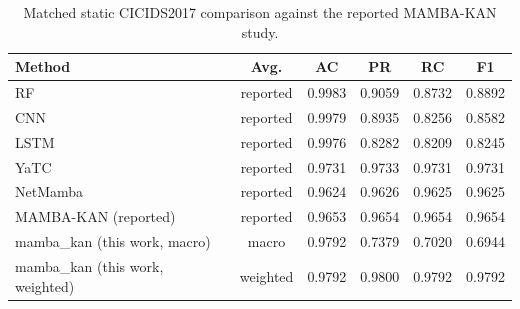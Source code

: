\begin{table}[t]
\centering
\caption{Matched static CICIDS2017 comparison against the reported MAMBA-KAN study.}
\label{tab:cicids2017-static-reference}
\begin{tabular}{lccccc}
\hline
Method & Avg. & AC & PR & RC & F1 \\
\hline
RF & reported & 0.9983 & 0.9059 & 0.8732 & 0.8892 \\
CNN & reported & 0.9979 & 0.8935 & 0.8256 & 0.8582 \\
LSTM & reported & 0.9976 & 0.8282 & 0.8209 & 0.8245 \\
YaTC & reported & 0.9731 & 0.9733 & 0.9731 & 0.9731 \\
NetMamba & reported & 0.9624 & 0.9626 & 0.9625 & 0.9625 \\
MAMBA-KAN (reported) & reported & 0.9653 & 0.9654 & 0.9654 & 0.9654 \\
mamba\_kan (this work, macro) & macro & 0.9792 & 0.7379 & 0.7020 & 0.6944 \\
mamba\_kan (this work, weighted) & weighted & 0.9792 & 0.9800 & 0.9792 & 0.9792 \\
\hline
\end{tabular}
\end{table}
